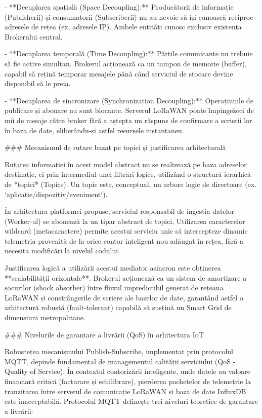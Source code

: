- **Decuplarea spațială (Space Decoupling):** Producătorii de informație
  (Publisherii) și consumatorii (Subscriberii) nu au nevoie să își
  cunoască reciproc adresele de rețea (ex. adresele IP). Ambele entități
  cunosc exclusiv existența Brokerului central.

- **Decuplarea temporală (Time Decoupling):** Părțile comunicante nu
  trebuie să fie active simultan. Brokerul acționează ca un tampon de
  memorie (buffer), capabil să rețină temporar mesajele până când
  serviciul de stocare devine disponibil să le preia.

- **Decuplarea de sincronizare (Synchronization Decoupling):**
  Operațiunile de publicare și abonare nu sunt blocante. Serverul
  LoRaWAN poate \"împinge\" zeci de mii de mesaje către broker fără a
  aștepta un răspuns de confirmare a scrierii lor în baza de date,
  eliberându-și astfel resursele instantaneu.

### Mecanismul de rutare bazat pe topici și justificarea arhitecturală

Rutarea informației în acest model abstract nu se realizează pe baza
adreselor destinație, ci prin intermediul unei filtrări logice,
utilizând o structură ierarhică de *topici* (Topics). Un topic este,
conceptual, un arbore logic de directoare (ex.
`aplicatie/dispozitiv/eveniment`).

În arhitectura platformei propuse, serviciul responsabil de ingestia
datelor (Worker-ul) se abonează la un tipar abstract de topici.
Utilizarea caracterelor wildcard (metacaractere) permite acestui
serviciu unic să intercepteze dinamic telemetria provenită de la orice
contor inteligent nou adăugat în rețea, fără a necesita modificări la
nivelul codului.

Justificarea logică a utilizării acestui mediator asincron este
obținerea **scalabilității orizontale**. Brokerul acționează ca un
sistem de amortizare a șocurilor (shock absorber) între fluxul
impredictibil generat de rețeaua LoRaWAN și constrângerile de scriere
ale bazelor de date, garantând astfel o arhitectură robustă
(fault-tolerant) capabilă să susțină un Smart Grid de dimensiuni
metropolitane.

### Nivelurile de garantare a livrării (QoS) în arhitectura IoT

Robustețea mecanismului Publish-Subscribe, implementat prin protocolul
MQTT, depinde fundamental de managementul calității serviciului (QoS -
Quality of Service). În contextul contorizării inteligente, unde datele
au valoare financiară critică (facturare și echilibrare), pierderea
pachetelor de telemetrie la tranzitarea între serverul de comunicație
LoRaWAN și baza de date InfluxDB este inacceptabilă. Protocolul MQTT
definește trei niveluri teoretice de garantare a livrării:

